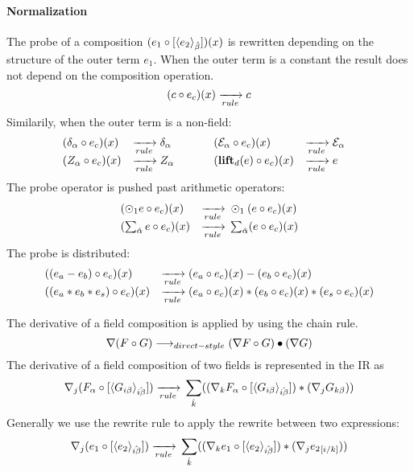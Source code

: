 \paragraph{Normalization}
The probe of a composition
 $(\expComp{e_1}{e_2}{\beta})(x)$ 
 is rewritten depending on the structure of the outer term $e_1$. 
When the outer term is a constant the result does not depend on the composition operation.
$$(\expCompSingle{ c}{e_2}{\beta})(x) \rewriteRule{} c $$
Similarily, when the outer term is a non-field:
$$\begin{array}{lllllll}
(\expCompSingle{ \delta_{\alpha}}{e_2}{\beta})(x) &\rewriteRule{} \delta_{\alpha}& \indent &
(\expCompSingle{ \mathcal{E}_{\alpha}}{e_2}{\beta})(x) &\rewriteRule{} \mathcal{E}_{\alpha}\\
(\expCompSingle{ Z_{\alpha}}{e_2}{\beta})(x) &\rewriteRule{} Z_{\alpha} &&
(\expCompSingle{ \lift{e}}{e_2}{\beta})(x) &\rewriteRule{} e &
\end{array}$$
The probe operator is pushed past arithmetic operators:
$$\begin{array}{lllll}
(\expCompSingle{\odot_1 e}{e_2}{\beta})(x) &\rewriteRule{} \odot_1 (  \expCompSingle{e}{e_2}{\beta})(x) \\
(\expCompSingle{\sum_{\hat{\alpha}} e}{e_2}{\beta})(x) &\rewriteRule{} \sum_{\hat{\alpha}} (  \expCompSingle{e}{e_2}{\beta})(x) \\
\end{array}$$
The probe is distributed: 
$$\begin{array}{lllll}
(\expCompSingle{(e_a - e_b)}{e_2}{\beta})(x) &\rewriteRule{} (\expCompSingle{e_a}{e_2}{\beta})(x) -(\expCompSingle{e_b}{e_2}{\beta})(x) \\
(\expCompSingle{(e_a * e_b * e_s )}{e_2}{\beta})(x) &\rewriteRule{} (\expCompSingle{e_a}{e_2}{\beta})(x) * (\expCompSingle{e_b}{e_2}{\beta})(x)*(\expCompSingle{e_s}{e_2}{\beta})(x) \end{array}$$



The derivative of a field composition is applied by using the chain rule.\\
$$\nabla (F \circ G) \rowSurface (\nabla F \circ G)\bullet (\nabla G) $$
The derivative of a field composition of two fields is represented in the \name{} IR as 
$$\nabla_j (\expComp{F_\alpha}{G_{i\beta}}{i\beta}) \rewriteRule{}
\sum_{\hat{k}}( (\expComp{\nabla_k  F_\alpha}{G_{i\beta}}{i\beta}) * (\nabla_j G_{k\beta}) )$$
Generally we use the rewrite rule to apply the rewrite between two \name{} expressions:\\
$$\nabla_j (\expComp{e_1}{e_2}{i\beta}) \rewriteRule{}
\sum_{\hat{k}}( (\expComp{\nabla_k  e_1}{e_2}{i\beta}) * (\nabla_j \expIndex{e_2}{i}{k}) )$$


